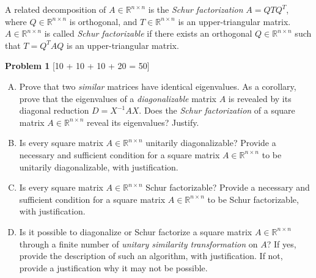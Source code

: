 \documentclass[11pt,a4paper]{article}
\begin{document}
A related decomposition of $A \in \mathbb{R}^{n \times n}$ is the \emph{Schur factorization} $A = QTQ^{T}$, where $Q \in \mathbb{R}^{n \times n}$ is orthogonal, and $T \in \mathbb{R}^{n \times n}$ is an upper-triangular matrix. $A \in \mathbb{R}^{n \times n}$ is called \emph{Schur factorizable} if there exists an orthogonal $Q \in \mathbb{R}^{n \times n}$ such that $T = Q^{T}AQ$ is an upper-triangular matrix.

\vspace*{20pt}

{\large\textbf{Problem 1}} \hfill [10 + 10 + 10 + 20 = 50]
\begin{enumerate}[A.]
\item Prove that two \emph{similar} matrices have identical eigenvalues. As a corollary, prove that the eigenvalues of a \emph{diagonalizable} matrix $A$ is revealed by its diagonal reduction $D = X^{-1}AX$. Does the \emph{Schur factorization} of a square matrix $A \in \mathbb{R}^{n \times n}$ reveal its eigenvalues? Justify.

\item Is every square matrix $A \in \mathbb{R}^{n \times n}$ unitarily diagonalizable? Provide a necessary and sufficient condition for a square matrix $A \in \mathbb{R}^{n \times n}$ to be unitarily diagonalizable, with justification.

\item Is every square matrix $A \in \mathbb{R}^{n \times n}$ Schur factorizable? Provide a necessary and sufficient condition for a square matrix $A \in \mathbb{R}^{n \times n}$ to be Schur factorizable, with justification.

\item Is it possible to diagonalize or Schur factorize a square matrix $A \in \mathbb{R}^{n \times n}$ through a finite number of \emph{unitary similarity transformation} on $A$? If yes, provide the description of such an algorithm, with justification. If not, provide a justification why it may not be possible.

\end{enumerate}
\end{document}
